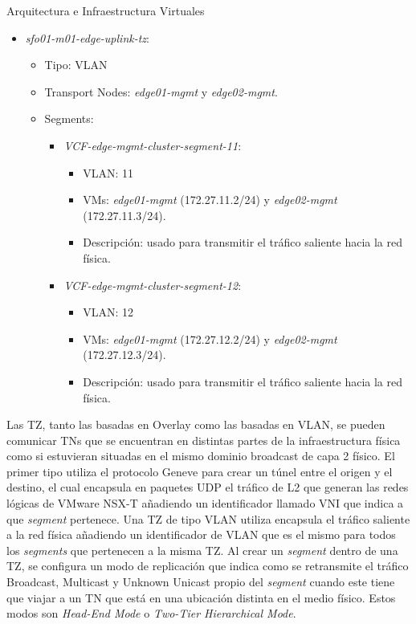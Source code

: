 \begin{subsection}{Arquitectura e Infraestructura Virtuales\cite{CFVirtInfraes}}
\begin{itemize}
\begin{itemize}
\begin{itemize}
\begin{itemize}
            \end{itemize}
        \end{itemize}
    \end{itemize}
  \item \textit{sfo01-m01-edge-uplink-tz}:
    \begin{itemize}
      \item Tipo: VLAN
      \item Transport Nodes: \textit{edge01-mgmt} y \textit{edge02-mgmt}.
      \item Segments:
        \begin{itemize}
          
          \item \textit{VCF-edge-mgmt-cluster-segment-11}:
            \begin{itemize}
              \item VLAN: 11
              \item VMs: \textit{edge01-mgmt} (172.27.11.2/24) y \textit{edge02-mgmt} (172.27.11.3/24).
              \item Descripción: usado para transmitir el tráfico saliente hacia la red física.
            \end{itemize}
          \item \textit{VCF-edge-mgmt-cluster-segment-12}:
            \begin{itemize}
              \item VLAN: 12
              \item VMs: \textit{edge01-mgmt} (172.27.12.2/24) y \textit{edge02-mgmt} (172.27.12.3/24).
              \item Descripción: usado para transmitir el tráfico saliente hacia la red física.
            \end{itemize}
        \end{itemize}
      \end{itemize}
\end{itemize}

Las TZ, tanto las basadas en Overlay como las basadas en VLAN, se pueden comunicar TNs que se encuentran en distintas partes de la infraestructura física como si estuvieran situadas en el mismo dominio broadcast de capa 2 físico. El primer tipo utiliza el protocolo Geneve para crear un túnel entre el origen y el destino, el cual encapsula en paquetes UDP el tráfico de L2 que generan las redes lógicas de VMware NSX-T añadiendo un identificador llamado VNI que indica a que \textit{segment} pertenece. Una TZ de tipo VLAN utiliza encapsula el tráfico saliente a la red física añadiendo un identificador de VLAN que es el mismo para todos los \textit{segments} que pertenecen a la misma TZ. Al crear un \textit{segment} dentro de una TZ, se configura un modo de replicación que indica como se retransmite el tráfico Broadcast, Multicast y Unknown Unicast propio del \textit{segment} cuando este tiene que viajar a un TN que está en una ubicación distinta en el medio físico. Estos modos son \textit{Head-End Mode} o \textit{Two-Tier Hierarchical Mode}.


\end{subsection}

